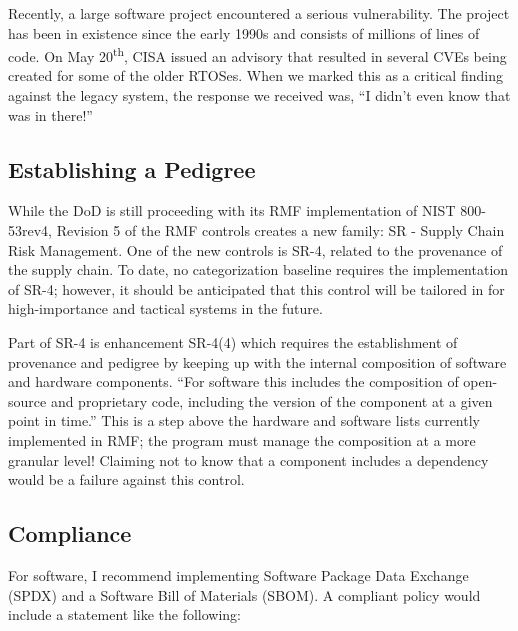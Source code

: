 Recently, a large software project encountered a serious vulnerability. The project has been in existence since the early 1990s and consists of millions of lines of code. On May 20\textsuperscript{th}, CISA issued an advisory that resulted in several CVEs being created for some of the older RTOSes.\autocite{20210628:ics21-119-04} When we marked this as a critical finding against the legacy system, the response we received was, ``I didn't even know that was in there!''

\subsection{Establishing a Pedigree}

While the DoD is still proceeding with its RMF implementation of NIST 800-53rev4, Revision 5 of the RMF controls creates a new family: SR - Supply Chain Risk Management. One of the new controls is SR-4, related to the provenance of the supply chain. To date, no categorization baseline requires the implementation of SR-4; however, it should be anticipated that this control will be tailored in for high-importance and tactical systems in the future. 

Part of SR-4 is enhancement SR-4(4) which requires the establishment of provenance and pedigree by keeping up with the internal composition of software and hardware components. ``For software this includes the composition of open-source and proprietary code, including the version of the component at a given point in time.''\autocite[\pno~]{20210628:nist80053rev5} This is a step above the hardware and software lists currently implemented in RMF; the program must manage the composition at a more granular level! Claiming not to know that a component includes a dependency would be a failure against this control.

\subsection{Compliance}

For software, I recommend implementing Software Package Data Exchange (SPDX) and a Software Bill of Materials (SBOM). A compliant policy would include a statement like the following:

